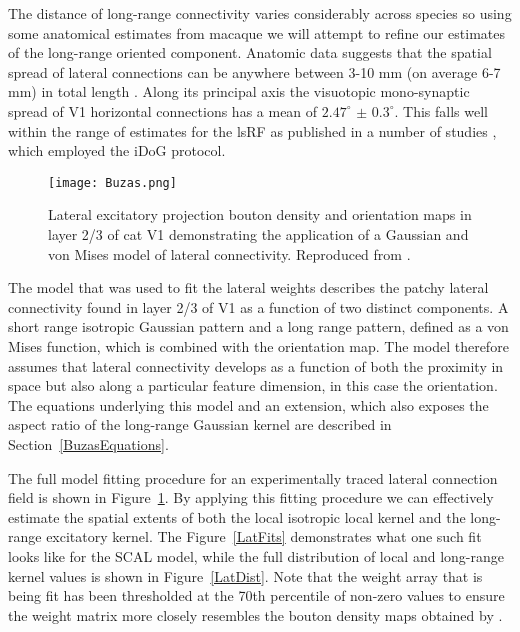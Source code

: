 The distance of long-range connectivity varies considerably across
species so using some anatomical estimates from macaque we will
attempt to refine our estimates of the long-range oriented
component. Anatomic data suggests that the spatial spread of lateral
connections can be anywhere between 3-10 mm (on average 6-7 mm) in
total length \citep{Angelucci2002}. Along its principal axis the
visuotopic mono-synaptic spread of V1 horizontal connections has a
mean of \(2.47^\circ\) \(\pm\) \(0.3^\circ\). This falls well within
the range of estimates for the lsRF as published in a number of
studies \citep{Sceniak1999, Sceniak2001, Shushruth2009}, which employed
the iDoG protocol.

\begin{figure}
	\centering
        \texttt{[image: Buzas.png]}
	\caption{Lateral excitatory projection bouton density and
      orientation maps in layer 2/3 of cat V1 demonstrating the
      application of a Gaussian and von Mises model of lateral
      connectivity. Reproduced from \cite{Buzas2006}.}
	\label{Buzas}
\end{figure}

The model that was used to fit the lateral weights describes the
patchy lateral connectivity found in layer 2/3 of V1 as a function of
two distinct components. A short range isotropic Gaussian pattern and
a long range pattern, defined as a von Mises function, which is
combined with the orientation map. The model therefore assumes that
lateral connectivity develops as a function of both the proximity in
space but also along a particular feature dimension, in this case the
orientation. The equations underlying this model and an extension,
which also exposes the aspect ratio of the long-range Gaussian kernel
are described in Section~\ref{BuzasEquations}.

The full model fitting procedure for an experimentally traced lateral
connection field is shown in Figure~\ref{Buzas}. By applying this
fitting procedure we can effectively estimate the spatial extents of
both the local isotropic local kernel and the long-range excitatory
kernel. The Figure~\ref{LatFits} demonstrates what one such fit looks
like for the SCAL model, while the full distribution of local and
long-range kernel values is shown in Figure~\ref{LatDist}. Note that
the weight array that is being fit has been thresholded at the 70th
percentile of non-zero values to ensure the weight matrix more closely
resembles the bouton density maps obtained by \cite{Buzas2006}.

